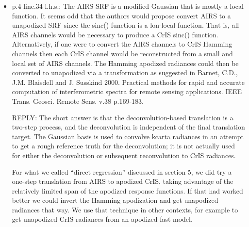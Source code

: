 \documentclass[11pt]{article}
\newcommand {\reply} {\mbox{\small REPLY}}
\begin{document}
\begin{itemize}
  \reply: We agree there is no loss in interferometric resolution
  with an invertible apodization.  Hamming apodization does reduce
  resolving power $R = v_i/ \fwhm_i$, since it increases $\fwhm$
  while decreasing the side-lobes.  We changed ``resolution'' to
  ``resolving power'' and set Barnet et al. 2000 as noted below as
  our first citation for apodization, for the sentence in question.


  
\item p.4 line.34 l.h.s.: The AIRS SRF is a modified Gaussian that
  is mostly a local function. It seems odd that the authors would
  propose convert AIRS to a unapodized SRF since the sinc() function
  is a lon-local function. That is, all AIRS channels would be
  necessary to produce a CrIS sinc() function. Alternatively, if one
  were to convert the AIRS channels to CrIS Hamming channels then
  each CrIS channel would be reconstructed from a small and local
  set of AIRS channels. The Hamming apodized radiances could then be
  converted to unapodized via a transformation as suggested in
  Barnet, C.D., J.M. Blaisdell and J.  Susskind 2000. Practical
  methods for rapid and accurate computation of interferometric
  spectra for remote sensing applications. IEEE
  Trans. Geosci. Remote Sens. v.38 p.169-183.

  \reply: The short answer is that the deconvolution-based
  translation is a two-step process, and the deconvolution is
  independent of the final translation target.  The Gaussian basis
  is used to convolve kcarta radiances in an attempt to get a rough
  reference truth for the deconvolution; it is not actually used 
  for either the deconvolution or subsequent reconvolution to CrIS
  radiances.

  For what we called ``direct regression'' discussed in section 5,
  we did try a one-step translation from AIRS to apodized CrIS,
  taking advantage of the relatively limited span of the apodized
  response functions.  If that had worked better we could invert the
  Hamming apodization and get unapodized radiances that way.  We use
  that technique in other contexts, for example to get unapodized
  CrIS radiances from an apodized fast model.


\end{itemize}
\end{document}
